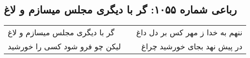 \begin{center}
\section*{رباعی شماره ۱۰۵۵: گر با دیگری مجلس میسازم و لاغ}
\label{sec:1055}
\begin{longtable}{l p{0.5cm} r}
گر با دیگری مجلس میسازم و لاغ
&&
ننهم به خدا ز مهر کس بر دل داغ
\\
لیکن چو فرو شود کسی را خورشید
&&
در پیش نهد بجای خورشید چراغ
\\
\end{longtable}
\end{center}
